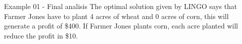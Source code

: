 \begin{frame}{Example 01 - Final analisis}
The optimal solution given by LINGO says that Farmer Jones have to plant 4 acres of wheat and 0 acres of corn, this will generate a profit of \$400. 
If Farmer Jones plants corn, each acre planted will reduce the profit in \$10.
\end{frame}
